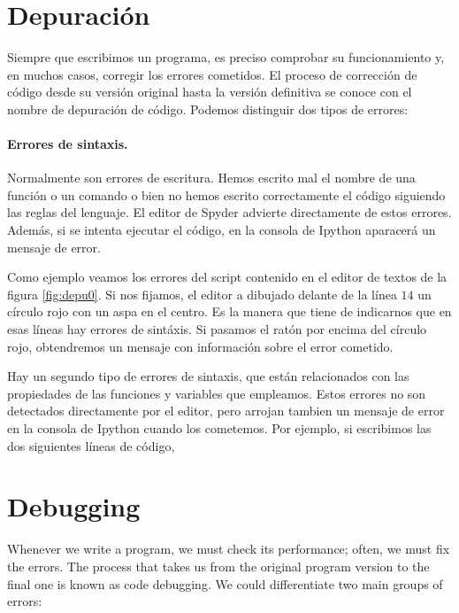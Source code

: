 \begin{paracol}{2}
\section{Depuración}
Siempre que escribimos un programa, es preciso comprobar su funcionamiento y, en  muchos casos, corregir los errores cometidos. El proceso de corrección de código desde su versión original hasta la versión definitiva se conoce con el nombre de depuración de código. Podemos distinguir dos tipos de errores:

\paragraph{Errores de sintaxis.} Normalmente son errores de escritura. Hemos escrito mal el nombre de una función o un comando o bien no hemos escrito correctamente el código siguiendo las reglas del lenguaje. El editor de Spyder advierte directamente de estos errores. Además, si se intenta ejecutar el código, en la consola de Ipython aparacerá un mensaje de error. 

Como ejemplo veamos los errores del script contenido  en el editor de textos de la figura \ref{fig:depu0}. Si nos fijamos, el editor a dibujado delante de la línea $14$ un círculo rojo con un aspa en el centro. Es la manera que tiene de indicarnos que en esas líneas hay errores de sintáxis. Si pasamos el ratón por encima del círculo rojo, obtendremos un mensaje con información sobre el error cometido.

Hay un segundo tipo de errores de sintaxis, que están relacionados con las propiedades de las funciones y variables que empleamos. Estos errores no son detectados directamente por el editor, pero arrojan tambien un mensaje de error en la consola de Ipython cuando los cometemos. Por ejemplo, si escribimos las dos siguientes líneas de código,
\switchcolumn
\section[Debugging]{Debugging}
Whenever we write a program, we must check its performance; often, we must fix the errors. The process that takes us from the original program version to the final one is known as code debugging. We could differentiate two main groups of errors:


\end{paracol}
